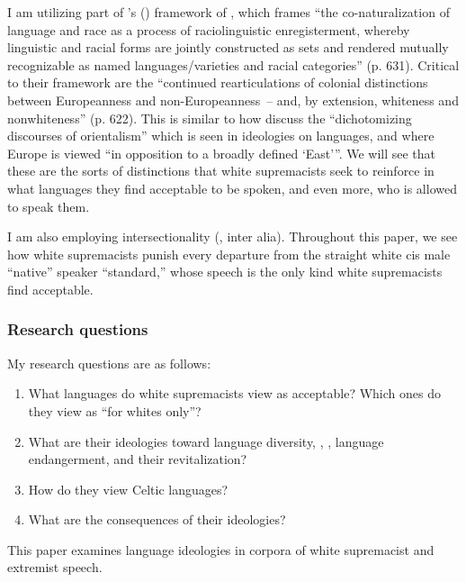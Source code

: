 \documentclass[output=paper,colorlinks,citecolor=brown]{langscibook}
\begin{document}
I am utilizing part of \citeauthor{jp:RosaFlores2017}'s (\citeyear{jp:RosaFlores2017}) framework of , which frames ``the co-naturalization of language and race as a process of raciolinguistic enregisterment, whereby linguistic and racial forms are jointly constructed as sets and rendered mutually recognizable as named languages/varieties and racial categories'' (p. 631). Critical to their framework are the ``continued rearticulations of colonial distinctions between Europeanness and non-Europeanness~-- and, by extension, whiteness and nonwhiteness'' (p. 622). This is similar to how \citet[73]{jp:IrvineGal2000} discuss the ``dichotomizing discourses of orientalism'' which is seen in ideologies on languages, and where Europe is viewed ``in opposition to a broadly defined `East'{''}. We will see that these are the sorts of distinctions that white supremacists seek to reinforce in what languages they find acceptable to be spoken, and even more, who is allowed to speak them.

I am also employing intersectionality (\citealt{jp:Crenshaw1989}, inter alia). Throughout this paper, we see how white supremacists punish every departure from the straight white cis male “native” speaker “standard,” whose speech is the only kind white supremacists find acceptable.


\subsubsection{Research questions}

My research questions are as follows:

\begin{enumerate}
\def\labelenumi{(\alph{enumi})}
    \item What languages do white supremacists view as acceptable? Which ones do they view as “for whites only”?
    \item What are their ideologies toward language diversity, , , language endangerment, and their revitalization?
    \item How do they view Celtic languages?
    \item What are the consequences of their ideologies?
\end{enumerate}

\noindent This paper examines language ideologies in corpora of white supremacist and extremist speech.
\end{document}
